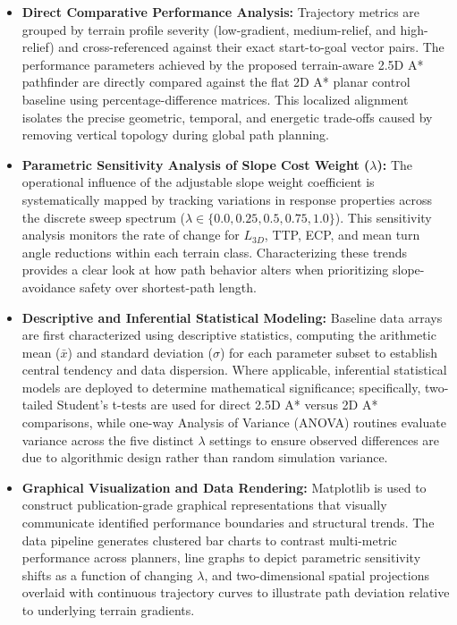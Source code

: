 \begin{itemize}
    \item \textbf{Direct Comparative Performance Analysis:} Trajectory metrics are grouped by terrain profile severity (low-gradient, medium-relief, and high-relief) and cross-referenced against their exact start-to-goal vector pairs. The performance parameters achieved by the proposed terrain-aware 2.5D A* pathfinder are directly compared against the flat 2D A* planar control baseline using percentage-difference matrices. This localized alignment isolates the precise geometric, temporal, and energetic trade-offs caused by removing vertical topology during global path planning.

    \item \textbf{Parametric Sensitivity Analysis of Slope Cost Weight ($\lambda$):} The operational influence of the adjustable slope weight coefficient is systematically mapped by tracking variations in response properties across the discrete sweep spectrum ($\lambda \in \{0.0, \allowbreak 0.25, \allowbreak 0.5, \allowbreak 0.75, \allowbreak 1.0\}$). This sensitivity analysis monitors the rate of change for $L_{3D}$, TTP, ECP, and mean turn angle reductions within each terrain class. Characterizing these trends provides a clear look at how path behavior alters when prioritizing slope-avoidance safety over shortest-path length.

    \item \textbf{Descriptive and Inferential Statistical Modeling:} Baseline data arrays are first characterized using descriptive statistics, computing the arithmetic mean ($\bar{x}$) and standard deviation ($\sigma$) for each parameter subset to establish central tendency and data dispersion. Where applicable, inferential statistical models are deployed to determine mathematical significance; specifically, two-tailed Student's t-tests are used for direct 2.5D A* versus 2D A* comparisons, while one-way Analysis of Variance (ANOVA) routines evaluate variance across the five distinct $\lambda$ settings to ensure observed differences are due to algorithmic design rather than random simulation variance.

    \item \textbf{Graphical Visualization and Data Rendering:} Matplotlib is used to construct publication-grade graphical representations that visually communicate identified performance boundaries and structural trends. The data pipeline generates clustered bar charts to contrast multi-metric performance across planners, line graphs to depict parametric sensitivity shifts as a function of changing $\lambda$, and two-dimensional spatial projections overlaid with continuous trajectory curves to illustrate path deviation relative to underlying terrain gradients.
\end{itemize}

